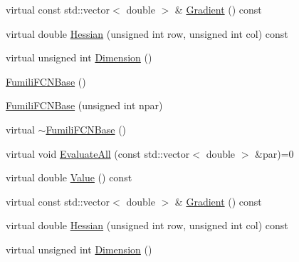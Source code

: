 \begin{DoxyCompactItemize}
\item 
virtual const std\+::vector$<$ double $>$ \& \mbox{\hyperlink{classROOT_1_1Minuit2_1_1FumiliFCNBase_ad226939ea2e83f754b5a6afc30876d3e}{Gradient}} () const
\item 
virtual double \mbox{\hyperlink{classROOT_1_1Minuit2_1_1FumiliFCNBase_ade134d8c6613393e942ef98d445db376}{Hessian}} (unsigned int row, unsigned int col) const
\item 
virtual unsigned int \mbox{\hyperlink{classROOT_1_1Minuit2_1_1FumiliFCNBase_ab8056ffdfd619915e22f1310db0644a6}{Dimension}} ()
\item 
\mbox{\hyperlink{classROOT_1_1Minuit2_1_1FumiliFCNBase_a118a4f34ec003713b719671842f5c6a2}{Fumili\+F\+C\+N\+Base}} ()
\item 
\mbox{\hyperlink{classROOT_1_1Minuit2_1_1FumiliFCNBase_ad20bc861c81429cd75a0b14d5449f066}{Fumili\+F\+C\+N\+Base}} (unsigned int npar)
\item 
virtual \mbox{\hyperlink{classROOT_1_1Minuit2_1_1FumiliFCNBase_a94961223a3baa0a131461be70a55a4e3}{$\sim$\+Fumili\+F\+C\+N\+Base}} ()
\item 
virtual void \mbox{\hyperlink{classROOT_1_1Minuit2_1_1FumiliFCNBase_a0741bb4a7405cc33ab60583472a189cb}{Evaluate\+All}} (const std\+::vector$<$ double $>$ \&par)=0
\item 
virtual double \mbox{\hyperlink{classROOT_1_1Minuit2_1_1FumiliFCNBase_a221dacee0ccde747a271a0cecd759f98}{Value}} () const
\item 
virtual const std\+::vector$<$ double $>$ \& \mbox{\hyperlink{classROOT_1_1Minuit2_1_1FumiliFCNBase_ad226939ea2e83f754b5a6afc30876d3e}{Gradient}} () const
\item 
virtual double \mbox{\hyperlink{classROOT_1_1Minuit2_1_1FumiliFCNBase_ade134d8c6613393e942ef98d445db376}{Hessian}} (unsigned int row, unsigned int col) const
\item 
virtual unsigned int \mbox{\hyperlink{classROOT_1_1Minuit2_1_1FumiliFCNBase_ab8056ffdfd619915e22f1310db0644a6}{Dimension}} ()
\end{DoxyCompactItemize}

